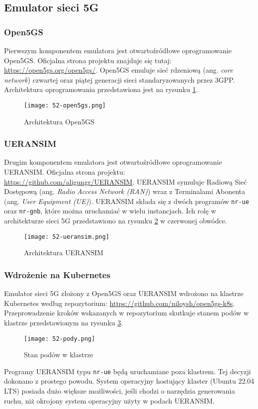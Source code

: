\subsection{Emulator sieci 5G}

\subsubsection{Open5GS}

Pierwszym komponentem emulatora jest otwartoźródłowe oprogramowanie Open5GS. Oficjalna strona projektu znajduje się tutaj: \url{https://open5gs.org/open5gs/}. Open5GS emuluje sieć rdzeniową (ang. \textit{core network}) czwartej oraz piątej generacji sieci standaryzowanych przez 3GPP. Architektura oprogramowania przedstawiona jest na rysunku \ref{fig:52-open5gs}.

\begin{figure}[!h]
    \centering \texttt{[image: 52-open5gs.png]}
    \caption{Architektura Open5GS}\label{fig:52-open5gs}
\end{figure}

\subsubsection{UERANSIM}

Drugim komponentem emulatora jest otwartoźródłowe oprogramowanie UERANSIM. Oficjalna strona projektu: \url{https://github.com/aligungr/UERANSIM}. UERANSIM symuluje Radiową Sieć Dostępową (ang. \textit{Radio Access Network (RAN)}) wraz z Terminalami Abonenta (ang. \textit{User Equipment (UE)}). UERANSIM składa się z dwóch programów \texttt{nr-ue} oraz \texttt{nr-gnb}, które można uruchamiać w wielu instancjach. Ich rolę w architekturze sieci 5G przedstawiono na rysunku \ref{fig:52-ueransim} w czerwonej obwódce.

\begin{figure}[!h]
    \centering \texttt{[image: 52-ueransim.png]}
    \caption{Architektura UERANSIM}\label{fig:52-ueransim}
\end{figure}

\subsubsection{Wdrożenie na Kubernetes}

Emulator sieci 5G złożony z Open5GS oraz UERANSIM wdrożono na klastrze Kubernetes według repozytorium: \url{https://github.com/niloysh/open5gs-k8s}. Przeprowadzenie kroków wskazanych w repozytorium skutkuje stanem podów w klastrze przedstawionym na rysunku \ref{fig:52-pody}.

\begin{figure}[!h]
    \centering \texttt{[image: 52-pody.png]}
    \caption{Stan podów w klastrze}\label{fig:52-pody}
\end{figure}

Programy UERANSIM typu \texttt{nr-ue} będą uruchamiane poza klastrem. Tej decyzji dokonano z prostego powodu. System operacyjny hostujący klaster (Ubuntu 22.04 LTS) posiada dużo większe możliwości, jeśli chodzi o narzędzia generowania ruchu, niż okrojony system operacyjny użyty w podach UERANSIM.